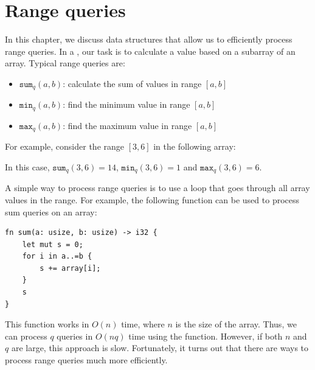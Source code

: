 \chapter{Range queries}


In this chapter, we discuss data structures
that allow us to efficiently process range queries.
In a ,
our task is to calculate a value
based on a subarray of an array.
Typical range queries are:
\begin{itemize}
\item $\texttt{sum}_q(a,b)$: calculate the sum of values in range $[a,b]$
\item $\texttt{min}_q(a,b)$: find the minimum value in range $[a,b]$
\item $\texttt{max}_q(a,b)$: find the maximum value in range $[a,b]$
\end{itemize}

For example, consider the range $[3,6]$ in the following array:
\begin{center}
\end{center}
In this case, $\texttt{sum}_q(3,6)=14$,
$\texttt{min}_q(3,6)=1$ and $\texttt{max}_q(3,6)=6$.

A simple way to process range queries is to use
a loop that goes through all array values in the range.
For example, the following function can be
used to process sum queries on an array:

\begin{lstlisting}
fn sum(a: usize, b: usize) -> i32 {
    let mut s = 0;
    for i in a..=b {
        s += array[i];
    }
    s
}
\end{lstlisting}

This function works in $O(n)$ time,
where $n$ is the size of the array.
Thus, we can process $q$ queries in $O(nq)$
time using the function.
However, if both $n$ and $q$ are large, this approach
is slow. Fortunately, it turns out that there are
ways to process range queries much more efficiently.

